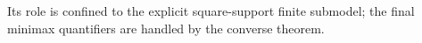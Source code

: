 Its role is confined to the explicit square-support finite submodel; the final minimax quantifiers are handled by the converse theorem.
